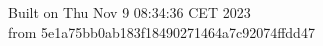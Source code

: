 {\noindent Built on Thu Nov  9 08:34:36 CET 2023} \\ 
 {\noindent from 5e1a75bb0ab183f18490271464a7c92074ffdd47}

